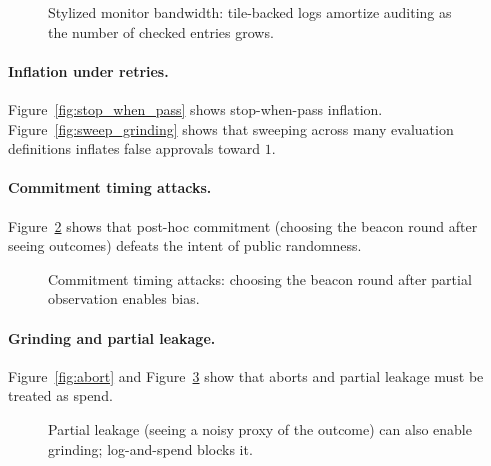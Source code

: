 \documentclass[11pt]{article}
\begin{document}
\begin{figure}[t]
\centering
{}
\caption{Stylized monitor bandwidth: tile-backed logs amortize auditing as the number of checked entries grows.}
\label{fig:tile_cost}
\end{figure}


\paragraph{Inflation under retries.}
Figure~\ref{fig:stop_when_pass} shows stop-when-pass inflation.
Figure~\ref{fig:sweep_grinding} shows that sweeping across many evaluation definitions inflates false approvals toward $1$.

\paragraph{Commitment timing attacks.}
Figure~\ref{fig:commit_timing} shows that post-hoc commitment (choosing the beacon round after seeing outcomes) defeats the intent of public randomness.

\begin{figure}[t]
\centering
{}
\caption{Commitment timing attacks: choosing the beacon round after partial observation enables bias.}
\label{fig:commit_timing}
\end{figure}

\paragraph{Grinding and partial leakage.}
Figure~\ref{fig:abort} and Figure~\ref{fig:partial_leak} show that aborts and partial leakage must be treated as spend.

\begin{figure}[t]
\centering
{}
\caption{Partial leakage (seeing a noisy proxy of the outcome) can also enable grinding; log-and-spend blocks it.}
\label{fig:partial_leak}
\end{figure}
\end{document}
